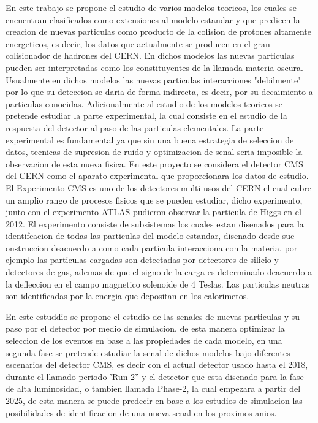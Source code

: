 En este trabajo se propone el estudio de varios modelos teoricos, los cuales se encuentran clasificados como extensiones al modelo estandar y que predicen la creacion de nuevas particulas como producto de la colision de protones altamente energeticos, es decir, los datos que actualmente se producen en el gran colisionador de hadrones del CERN.  En dichos modelos las nuevas particulas pueden ser interpretadas como los constituyentes de la llamada materia oscura.  Usualmente en dichos modelos las nuevas particulas interacciones "debilmente" por lo que su deteccion se daria de forma indirecta, es decir, por su decaimiento a particulas conocidas.  Adicionalmente al estudio de los modelos teoricos se pretende estudiar la parte experimental, la cual consiste en el estudio de la respuesta del detector al paso de las particulas elementales.  La parte experimental es fundamental ya que sin una buena estrategia de seleccion de datos, tecnicas de supresion de ruido y optimizacion de senal seria imposible la observacion de esta nueva fisica. En este proyecto se considera el detector CMS del CERN como el aparato experimental que proporcionara los datos de estudio.  El Experimento CMS es uno de los detectores multi usos del CERN el cual cubre un amplio rango de procesos fisicos que se pueden estudiar, dicho experimento, junto con el experimento ATLAS pudieron observar la particula de Higgs en el 2012.  El experimento consiste de subsistemas los cuales estan disenados para la identifcacion de todas las particulas del modelo estandar, disenado desde suc onstruccion deacuerdo a como cada particula interacciona con la materia, por ejemplo las particulas cargadas son detectadas por detectores de silicio y detectores de gas, ademas de que el signo de la carga es determinado deacuerdo a la defleccion en el campo magnetico solenoide de 4 Teslas.  Las particulas neutras son identificadas por la energia que depositan en los calorimetos.   

En este estuddio se propone el estudio de las senales de nuevas particulas y su paso por el detector por medio de simulacion, de esta manera optimizar la seleccion de los eventos en base a las propiedades de cada modelo, en una segunda fase se pretende estudiar la senal de dichos modelos bajo diferentes escenarios del detector CMS, es decir con el actual detector usado hasta el 2018, durante el llamado periodo 'Run-2'' y el detector que esta disenado para la fase de alta luminosidad, o tambien llamada Phase-2, la cual empezara  a partir del 2025, de esta manera se puede predecir en base a los estudios de simulacion las posibilidades de identificacion de una nueva senal en los proximos anios. 

